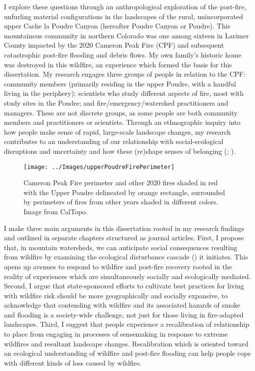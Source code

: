 \documentclass[
]{article}
\begin{document}
I explore these questions through an anthropological exploration of the post-fire, unfurling material configurations in the landscapes of the rural, unincorporated upper Cache la Poudre Canyon (hereafter Poudre Canyon or Poudre). This mountainous community in northern Colorado was one among sixteen in Larimer County impacted by the 2020 Cameron Peak Fire (CPF) and subsequent catastrophic post-fire flooding and debris flows. My own family's historic home was destroyed in this wildfire, an experience which formed the basis for this dissertation. My research engages three groups of people in relation to the CPF: community members (primarily residing in the upper Poudre, with a handful living in the periphery); scientists who study different aspects of fire, most with study sites in the Poudre; and fire/emergency/watershed practitioners and managers. These are not discrete groups, as some people are both community members and practitioners or scientists. Through an ethnographic inquiry into how people make sense of rapid, large-scale landscape changes, my research contributes to an understanding of our relationship with social-ecological disruptions and uncertainty and how these (re)shape senses of belonging (; ).

\begin{figure}
\texttt{[image: ../Images/upperPoudreFirePerimeter]} \caption[CPF Perimeter]{Cameron Peak Fire perimeter and other 2020 fires shaded in red with the Upper Poudre delineated by orange rectangle, surrounded by perimeters of fires from other years shaded in different colors. Image from CalTopo.}\label{fig:figureTitle1}
\end{figure}

I make three main arguments in this dissertation rooted in my research findings and outlined in separate chapters structured as journal articles. First, I propose that, in mountain watersheds, we can anticipate social consequences resulting from wildfire by examining the ecological disturbance cascade () it initiates. This opens up avenues to respond to wildfire and post-fire recovery rooted in the reality of experiences which are simultaneously socially and ecologically mediated. Second, I argue that state-sponsored efforts to cultivate best practices for living with wildfire risk should be more geographically and socially expansive, to acknowledge that contending with wildfire and its associated hazards of smoke and flooding is a society-wide challenge, not just for those living in fire-adapted landscapes. Third, I suggest that people experience a recalibration of relationship to place from engaging in processes of sensemaking in response to extreme wildfires and resultant landscape changes. Recalibration which is oriented toward an ecological understanding of wildfire and post-fire flooding can help people cope with different kinds of loss caused by wildfire.
\end{document}
